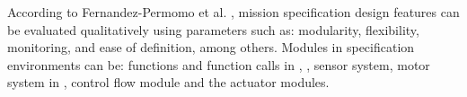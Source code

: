 
According to Fernandez-Permomo et al. \cite{Fernandez-Perdomo2010}, mission specification design features can be evaluated qualitatively using parameters such as: modularity, flexibility, monitoring, and ease of definition, among others. Modules in specification environments can be: functions and function calls in \ardublockly, \openroberta, sensor system, motor system in \picaxe, control flow module and the actuator modules.

